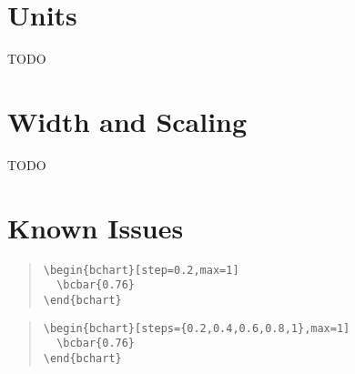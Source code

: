 \documentclass{article}
\begin{document}
\section{Units}

TODO


\section{Width and Scaling}

TODO


\section{Known Issues}

\begin{quote}\small
\begin{verbatim}
\begin{bchart}[step=0.2,max=1]
  \bcbar{0.76}
\end{bchart}
\end{verbatim}
\end{quote}
\begin{quote}
\begin{bchart}[step=0.2,max=1]
\end{bchart}
\end{quote}

\begin{quote}\small
\begin{verbatim}
\begin{bchart}[steps={0.2,0.4,0.6,0.8,1},max=1]
  \bcbar{0.76}
\end{bchart}
\end{verbatim}
\end{quote}
\begin{quote}
\begin{bchart}[steps={0.2,0.4,0.6,0.8,1},max=1]
\end{bchart}
\end{quote}



\begin{bchart}[plain]
\end{bchart}

\begin{bchart}[min=0.75,step=0.25,max=3]
\end{bchart}

\begin{bchart}[max=100,step=10,width=0.8\textwidth]
\end{bchart}
\end{document}

